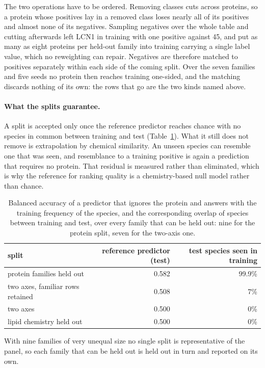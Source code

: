The two operations have to be ordered. Removing classes cuts across proteins, so a protein whose
positives lay in a removed class loses nearly all of its positives and almost none of its
negatives. Sampling negatives over the whole table and cutting afterwards left LCN1 in training
with one positive against 45, and put as many as eight proteins per held-out family into training
carrying a single label value, which no reweighting can repair. Negatives are therefore matched to
positives separately within each side of the coming split. Over the seven families and five seeds
no protein then reaches training one-sided, and the matching discards nothing of its own: the rows
that go are the two kinds named above.

\paragraph{What the splits guarantee.} A split is accepted only once the reference predictor
reaches chance with no species in common between training and test (Table~\ref{tab:baselines}).
What it still does not remove is extrapolation by chemical similarity. An unseen species can
resemble one that was seen, and resemblance to a training positive is again a prediction that
requires no protein. That residual is measured rather than eliminated, which is why the reference
for ranking quality is a chemistry-based null model rather than chance.

\begin{table}[htbp]
\centering
\begin{tabular}{lrr}
\hline
split & reference predictor (test) & test species seen in training \\
\hline
protein families held out & 0.582 & 99.9\% \\
two axes, familiar rows retained & 0.508 & 7\% \\
two axes & 0.500 & 0\% \\
lipid chemistry held out & 0.500 & 0\% \\
\hline
\end{tabular}
\caption{Balanced accuracy of a predictor that ignores the protein and answers with the training
frequency of the species, and the corresponding overlap of species between training and test, over
every family that can be held out: nine for the protein split, seven for the two-axis one.}
\label{tab:baselines}
\end{table}

With nine families of very unequal size no single split is representative of the panel, so each
family that can be held out is held out in turn and reported on its own.